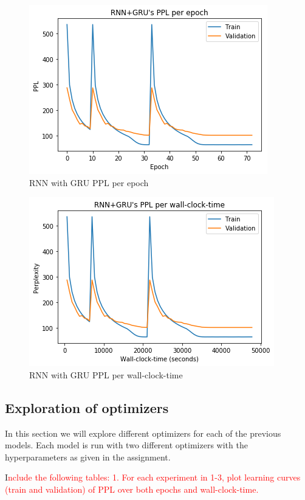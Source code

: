 \begin{figure}[H]
	\centering
	\includegraphics[scale=0.8]{GRU_LC_EPOCH.png}
	\caption{RNN with GRU PPL per epoch}
	\label{fig:fig3}
\end{figure}

\begin{figure}[H]
	\centering
	\includegraphics[scale=0.8]{GRU_LC_TIME.png}
	\caption{RNN with GRU PPL per wall-clock-time}
	\label{fig:fig4}
\end{figure}


\subsection{Exploration of optimizers}
In this section we will explore different optimizers for each of the previous models. Each model is run with two different optimizers with the hyperparameters as given in the assignment. 

I\textcolor{red}{nclude the following tables:
	1. For each experiment in 1-3, plot learning curves (train and validation) of PPL over both
	epochs and wall-clock-time.}

